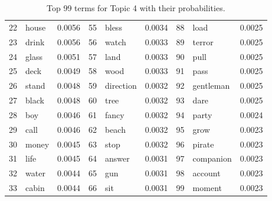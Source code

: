 \begin{table}[ht]
\begin{tabular}{rlrrlrrlr}
  22 & house & 0.0056 & 55 & bless & 0.0034 & 88 & load & 0.0025 \\ 
  23 & drink & 0.0056 & 56 & watch & 0.0033 & 89 & terror & 0.0025 \\ 
  24 & glass & 0.0051 & 57 & land & 0.0033 & 90 & pull & 0.0025 \\ 
  25 & deck & 0.0049 & 58 & wood & 0.0033 & 91 & pass & 0.0025 \\ 
  26 & stand & 0.0048 & 59 & direction & 0.0032 & 92 & gentleman & 0.0025 \\ 
  27 & black & 0.0048 & 60 & tree & 0.0032 & 93 & dare & 0.0025 \\ 
  28 & boy & 0.0046 & 61 & fancy & 0.0032 & 94 & party & 0.0024 \\ 
  29 & call & 0.0046 & 62 & beach & 0.0032 & 95 & grow & 0.0023 \\ 
  30 & money & 0.0045 & 63 & stop & 0.0032 & 96 & pirate & 0.0023 \\ 
  31 & life & 0.0045 & 64 & answer & 0.0031 & 97 & companion & 0.0023 \\ 
  32 & water & 0.0044 & 65 & gun & 0.0031 & 98 & account & 0.0023 \\ 
  33 & cabin & 0.0044 & 66 & sit & 0.0031 & 99 & moment & 0.0023 \\ 
   \hline
\end{tabular}
\caption{\small{ Top 99 terms for Topic 4 with their probabilities.}} 
\label{topic_4_terms}
\end{table}
